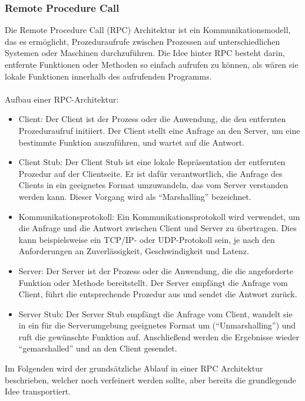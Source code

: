 \subsubsection{Remote Procedure Call}

Die Remote Procedure Call (RPC) Architektur ist ein Kommunikationsmodell, das es ermöglicht, Prozeduraufrufe zwischen Prozessen auf unterschiedlichen Systemen oder Maschinen durchzuführen. Die Idee hinter RPC besteht darin, entfernte Funktionen oder Methoden so einfach aufrufen zu können, als wären sie lokale Funktionen innerhalb des aufrufenden Programms.
\\\\
Aufbau einer RPC-Architektur:
\begin{itemize} 
\item Client: Der Client ist der Prozess oder die Anwendung, die den entfernten Prozeduraufruf initiiert. Der Client stellt eine Anfrage an den Server, um eine bestimmte Funktion auszuführen, und wartet auf die Antwort.
\item Client Stub: Der Client Stub ist eine lokale Repräsentation der entfernten Prozedur auf der Clientseite. Er ist dafür verantwortlich, die Anfrage des Clients in ein geeignetes Format umzuwandeln, das vom Server verstanden werden kann. Dieser Vorgang wird als \enquote{Marshalling} bezeichnet.
\item Kommunikationsprotokoll: Ein Kommunikationsprotokoll wird verwendet, um die Anfrage und die Antwort zwischen Client und Server zu übertragen. Dies kann beispielsweise ein TCP/IP- oder UDP-Protokoll sein, je nach den Anforderungen an Zuverlässigkeit, Geschwindigkeit und Latenz.
\item Server: Der Server ist der Prozess oder die Anwendung, die die angeforderte Funktion oder Methode bereitstellt. Der Server empfängt die Anfrage vom Client, führt die entsprechende Prozedur aus und sendet die Antwort zurück.
\item Server Stub: Der Server Stub empfängt die Anfrage vom Client, wandelt sie in ein für die Serverumgebung geeignetes Format um (\enquote{Unmarshalling}) und ruft die gewünschte Funktion auf. Anschließend werden die Ergebnisse wieder \enquote{gemarshalled} und an den Client gesendet.
\end{itemize}     

Im Folgenden wird der grundsätzliche Ablauf in einer RPC Architektur beschrieben, welcher noch verfeinert werden sollte, aber bereits die grundlegende Idee transportiert. 

